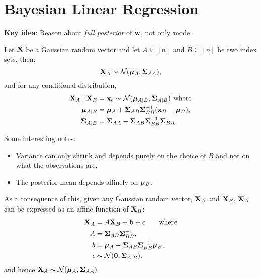 \section{Bayesian Linear Regression}

\textbf{Key idea}: Reason about \textit{full posterior} of \(\vb{w}\), not only  mode.


\begin{theorem*}
    Let \(\vb{X}\) be a Gaussian random vector and let \(A \subseteq [n]\) and \(B \subseteq [n]\) be two index sets, then:
    \[\vb{X}_A \sim \operatorname{\mathcal{N}}(\vb*{\mu}_A, \vb*{\Sigma}_{AA}),\]
    and for any conditional distribution,
    \begin{align*}
        \vb{X}_A \mid \vb{X}_B &= \vb{x}_b \sim \operatorname{\mathcal{N}} (\vb*{\mu}_{A \mid B}, \vb*{\Sigma}_{A \mid B}) \ \text{where} \\
        \vb*{\mu}_{A \mid B} &= \vb*{\mu}_A + \vb*{\Sigma}_{AB}\vb*{\Sigma}_{BB}^{-1}(\vb{x}_B - \vb*{\mu}_B),\\
        \vb*{\Sigma}_{A \mid B} &= \vb*{\Sigma}_{AA} - \vb*{\Sigma}_{AB}\vb*{\Sigma}_{BB}^{-1}\vb*{\Sigma}_{BA}.
    \end{align*}

    Some interesting notes:
    \begin{itemize}
        \item Variance can only shrink and depends purely on the choice of \(B\) and not on what the observations are.
        \item The posterior mean depends affinely on \(\vb*{\mu}_B\).
    \end{itemize}
\end{theorem*}

\begin{lemma}
    As a consequence of this, given any Gaussian random vector, \(\vb{X}_A\) and \(\vb{X}_B\), \(\vb{X}_A\) can be expressed as an affine function of \(\vb{X}_B\):
    \begin{align*}
        \vb{X}_A &= A \vb{X}_B + \vb{b} + \epsilon \qquad \text{where} \\
        A &= \vb*{\Sigma}_{AB}\vb*{\Sigma}_{BB}^{-1}, \\
        b &= \vb*{\mu}_A - \vb*{\Sigma}_{AB}\vb*{\Sigma}_{BB}^{-1}\vb*{\mu}_B, \\
        \epsilon &\sim \operatorname{\mathcal{N}}(\vb{0}, \vb*{\Sigma}_{A \mid B}).
    \end{align*}
    and hence \(\vb{X}_A \sim \operatorname{\mathcal{N}}(\vb*{\mu}_A, \vb*{\Sigma}_{AA})\).
\end{lemma}

